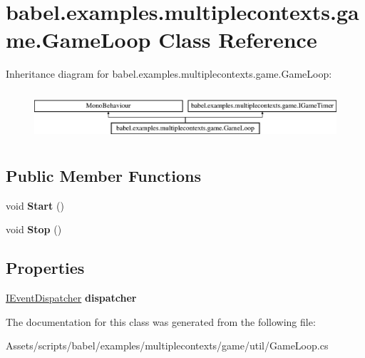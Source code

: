 \hypertarget{classbabel_1_1examples_1_1multiplecontexts_1_1game_1_1_game_loop}{\section{babel.\-examples.\-multiplecontexts.\-game.\-Game\-Loop Class Reference}
\label{classbabel_1_1examples_1_1multiplecontexts_1_1game_1_1_game_loop}
}
Inheritance diagram for babel.\-examples.\-multiplecontexts.\-game.\-Game\-Loop\-:\begin{figure}[H]
\begin{center}
\leavevmode
\includegraphics[height=1.848185cm]{classbabel_1_1examples_1_1multiplecontexts_1_1game_1_1_game_loop}
\end{center}
\end{figure}
\subsection*{Public Member Functions}
\begin{DoxyCompactItemize}
\item 
\hypertarget{classbabel_1_1examples_1_1multiplecontexts_1_1game_1_1_game_loop_a3991ff15c6602d5f8f22702135a52903}{void {\bfseries Start} ()}\label{classbabel_1_1examples_1_1multiplecontexts_1_1game_1_1_game_loop_a3991ff15c6602d5f8f22702135a52903}

\item 
\hypertarget{classbabel_1_1examples_1_1multiplecontexts_1_1game_1_1_game_loop_a9539ae66df3fe208b7fd156a6036d88a}{void {\bfseries Stop} ()}\label{classbabel_1_1examples_1_1multiplecontexts_1_1game_1_1_game_loop_a9539ae66df3fe208b7fd156a6036d88a}

\end{DoxyCompactItemize}
\subsection*{Properties}
\begin{DoxyCompactItemize}
\item 
\hypertarget{classbabel_1_1examples_1_1multiplecontexts_1_1game_1_1_game_loop_adbad8554b6b2a15c52ac1098677b940f}{\hyperlink{interfacebabel_1_1extensions_1_1dispatcher_1_1eventdispatcher_1_1api_1_1_i_event_dispatcher}{I\-Event\-Dispatcher} {\bfseries dispatcher}}\label{classbabel_1_1examples_1_1multiplecontexts_1_1game_1_1_game_loop_adbad8554b6b2a15c52ac1098677b940f}

\end{DoxyCompactItemize}


The documentation for this class was generated from the following file\-:\begin{DoxyCompactItemize}
\item 
Assets/scripts/babel/examples/multiplecontexts/game/util/Game\-Loop.\-cs\end{DoxyCompactItemize}
